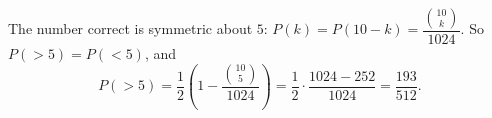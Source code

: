 The number correct is symmetric about $5$: $P(k)=P(10-k)=\dfrac{\binom{10}k}{1024}$. So $P(>5)=P(<5)$, and
\[P(>5)=\dfrac12\left(1-\dfrac{\binom{10}5}{1024}\right)=\dfrac12\cdot\dfrac{1024-252}{1024}=\boxed{\dfrac{193}{512}}.\]
